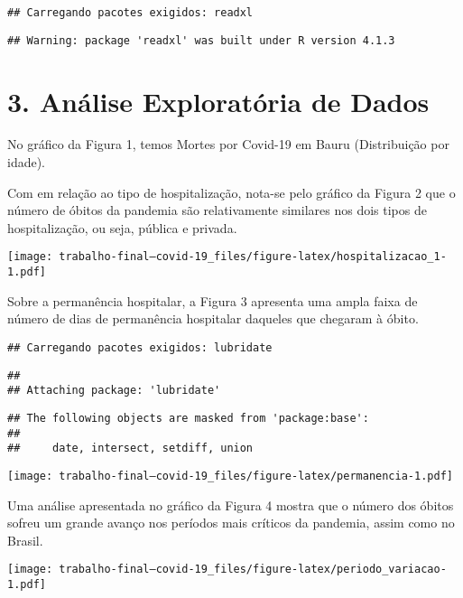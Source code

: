 \documentclass[
]{article}
\begin{document}
\begin{verbatim}
## Carregando pacotes exigidos: readxl
\end{verbatim}

\begin{verbatim}
## Warning: package 'readxl' was built under R version 4.1.3
\end{verbatim}

\hypertarget{anuxe1lise-exploratuxf3ria-de-dados}{%
\section{3. Análise Exploratória de
Dados}\label{anuxe1lise-exploratuxf3ria-de-dados}}

No gráfico da Figura 1, temos Mortes por Covid-19 em Bauru (Distribuição
por idade).

Com em relação ao tipo de hospitalização, nota-se pelo gráfico da Figura
2 que o número de óbitos da pandemia são relativamente similares nos
dois tipos de hospitalização, ou seja, pública e privada.

\texttt{[image: trabalho-final---covid-19\_files/figure-latex/hospitalizacao\_1-1.pdf]}

Sobre a permanência hospitalar, a Figura 3 apresenta uma ampla faixa de
número de dias de permanência hospitalar daqueles que chegaram à óbito.

\begin{verbatim}
## Carregando pacotes exigidos: lubridate
\end{verbatim}

\begin{verbatim}
## 
## Attaching package: 'lubridate'
\end{verbatim}

\begin{verbatim}
## The following objects are masked from 'package:base':
## 
##     date, intersect, setdiff, union
\end{verbatim}

\texttt{[image: trabalho-final---covid-19\_files/figure-latex/permanencia-1.pdf]}

Uma análise apresentada no gráfico da Figura 4 mostra que o número dos
óbitos sofreu um grande avanço nos períodos mais críticos da pandemia,
assim como no Brasil.

\texttt{[image: trabalho-final---covid-19\_files/figure-latex/periodo\_variacao-1.pdf]}
\end{document}
